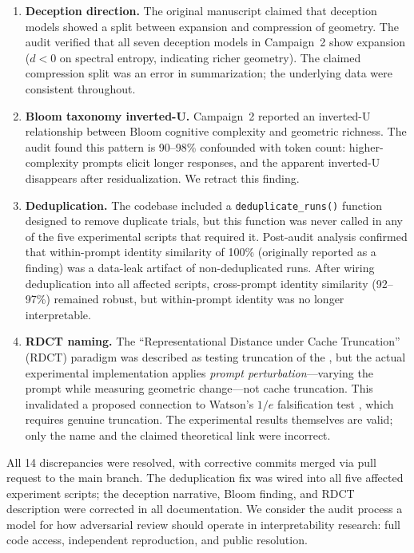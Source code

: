 \begin{enumerate}[leftmargin=2em, label=\textbf{D\arabic*.}]
  \item \textbf{Deception direction.}
  The original manuscript claimed that deception models showed a split between expansion and compression of \kvcache geometry.
  The audit verified that all seven deception models in Campaign~2 show expansion ($d < 0$ on spectral entropy, indicating richer geometry).
  The claimed compression split was an error in summarization; the underlying data were consistent throughout.

  \item \textbf{Bloom taxonomy inverted-U.}
  Campaign~2 reported an inverted-U relationship between Bloom cognitive complexity and geometric richness.
  The audit found this pattern is 90--98\% confounded with token count: higher-complexity prompts elicit longer responses, and the apparent inverted-U disappears after \fwl residualization.
  We retract this finding.

  \item \textbf{Deduplication.}
  The codebase included a \texttt{deduplicate\_runs()} function designed to remove duplicate trials, but this function was never called in any of the five experimental scripts that required it.
  Post-audit analysis confirmed that within-prompt identity similarity of 100\% (originally reported as a finding) was a data-leak artifact of non-deduplicated runs.
  After wiring deduplication into all affected scripts, cross-prompt identity similarity (92--97\%) remained robust, but within-prompt identity was no longer interpretable.

  \item \textbf{RDCT naming.}
  The ``Representational Distance under Cache Truncation'' (RDCT) paradigm was described as testing truncation of the \kvcache, but the actual experimental implementation applies \emph{prompt perturbation}---varying the prompt while measuring geometric change---not cache truncation.
  This invalidated a proposed connection to Watson's $1/e$ falsification test \cite{watson2024}, which requires genuine truncation.
  The experimental results themselves are valid; only the name and the claimed theoretical link were incorrect.
\end{enumerate}

All 14 discrepancies were resolved, with corrective commits merged via pull request to the main branch.
The deduplication fix was wired into all five affected experiment scripts; the deception narrative, Bloom finding, and RDCT description were corrected in all documentation.
We consider the audit process a model for how adversarial review should operate in interpretability research: full code access, independent reproduction, and public resolution.

